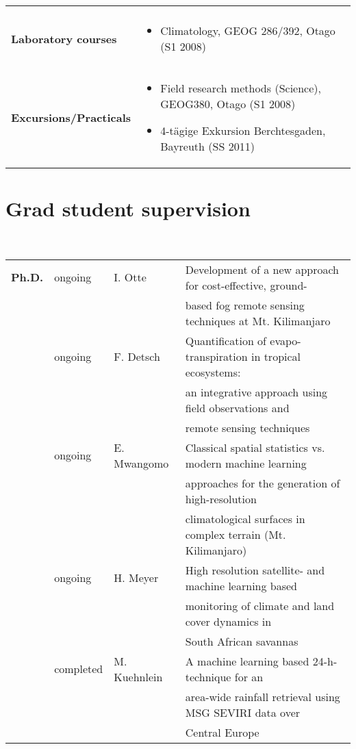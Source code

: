 \documentclass[a4paper,11pt]{article}
\begin{document}
\begin{tabular}{ll}
{\begin{itemize}
            \end{itemize} }
\\      \begin{minipage}[t]{0.2\textwidth}
       \raisebox{0mm} {\textbf{Laboratory courses}}
       \end{minipage}
        & \parbox{0.75\textwidth}{
            \begin{itemize} \itemsep1pt \parskip0pt 
                \item Climatology, GEOG 286/392, Otago (S1 2008)
            \end{itemize} }
\\      \begin{minipage}[t]{0.2\textwidth}
       \raisebox{2mm} {\textbf{Excursions/Practicals}}
       \end{minipage}
        & \parbox{0.75\textwidth}{
            \begin{itemize} \itemsep1pt \parskip0pt 
                \item Field research methods (Science), GEOG380, Otago (S1 2008)
                \item 4-t\"agige Exkursion Berchtesgaden, Bayreuth (SS 2011)
            \end{itemize} }
\end{tabular}

\pagebreak{}
\section{Grad student supervision}
\hrulefill \\
\begin{tabular}{llll} \\
\textbf{Ph.D.} & ongoing & I. Otte & Development of a new approach for cost-effective, ground-\\
	  & & & based fog remote sensing techniques at Mt. Kilimanjaro\\
	  & ongoing & F. Detsch & Quantification of evapo-transpiration in tropical ecosystems:\\
	  & & & an integrative approach using field observations and\\
	  & & & remote sensing techniques\\
	  & ongoing & E. Mwangomo & Classical spatial statistics vs. modern machine learning\\
	  & & & approaches for the generation of high-resolution\\
	  & & & climatological surfaces in complex terrain (Mt. Kilimanjaro)\\
	  & ongoing & H. Meyer & High resolution satellite- and machine learning based\\
      & & & monitoring of climate and land cover dynamics in\\
      & & & South African savannas\\
      & completed & M. Kuehnlein & A machine learning based 24-h-technique for an\\
      & & & area-wide rainfall retrieval using MSG SEVIRI data over\\
      & & & Central Europe\\
\end{tabular}
\end{document}
